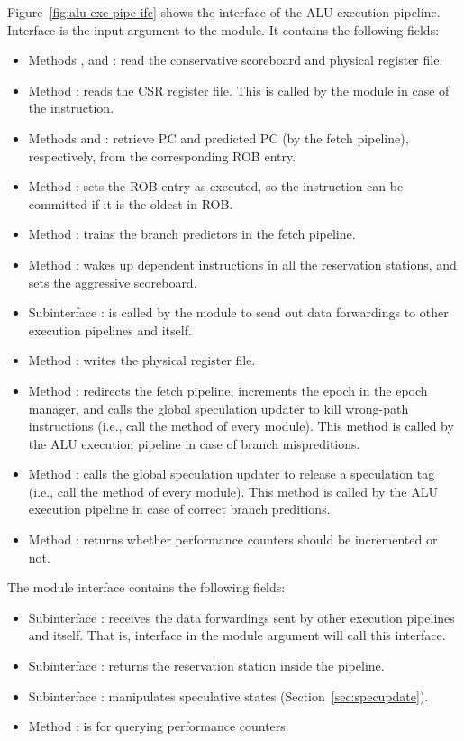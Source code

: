 Figure~\ref{fig:alu-exe-pipe-ifc} shows the interface of the ALU execution pipeline.
Interface  is the input argument to the module.
It contains the following fields:
\begin{itemize}
    \item Methods ,  and : read the conservative scoreboard and physical register file.
    \item Method : reads the CSR register file.
    This is called by the module in case of the  instruction.
    \item Methods  and : retrieve PC and predicted PC (by the fetch pipeline), respectively, from the corresponding ROB entry.
    \item Method : sets the ROB entry as executed, so the instruction can be committed if it is the oldest in ROB.
    \item Method : trains the branch predictors in the fetch pipeline.
    \item Method : wakes up dependent instructions in all the reservation stations, and sets the aggressive scoreboard.
    \item Subinterface : is called by the module to send out data forwardings to other execution pipelines and itself.
    \item Method : writes the physical register file.
    \item Method : redirects the fetch pipeline, increments the epoch in the epoch manager, and calls the global speculation updater to kill wrong-path instructions (i.e., call the  method of every module).
    This method is called by the ALU execution pipeline in case of branch mispreditions.
    \item Method : calls the global speculation updater to release a speculation tag (i.e., call the  method of every module).
    This method is called by the ALU execution pipeline in case of correct branch preditions.
    \item Method : returns whether performance counters should be incremented or not.
\end{itemize}
The module interface  contains the following fields:
\begin{itemize}
    \item Subinterface : receives the data forwardings sent by other execution pipelines and itself.
    That is, interface  in the module argument will call this interface.
    \item Subinterface : returns the reservation station inside the pipeline.
    \item Subinterface : manipulates speculative states (Section~\ref{sec:specupdate}).
    \item Method : is for querying performance counters.
\end{itemize}

